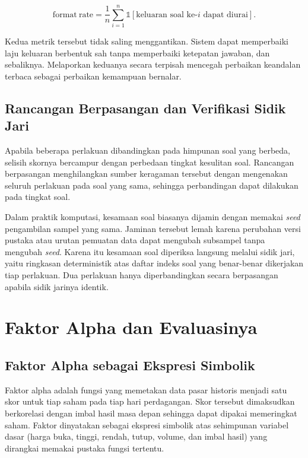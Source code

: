 \begin{equation}
    \mathrm{format\ rate} = \frac{1}{n}\sum_{i=1}^{n}
    \mathbb{1}\!\left[\text{keluaran soal ke-}i\text{ dapat diurai}\right].
\end{equation}

Kedua metrik tersebut tidak saling menggantikan. Sistem dapat memperbaiki laju
keluaran berbentuk sah tanpa memperbaiki ketepatan jawaban, dan sebaliknya.
Melaporkan keduanya secara terpisah mencegah perbaikan keandalan terbaca
sebagai perbaikan kemampuan bernalar.

\subsection{Rancangan Berpasangan dan Verifikasi Sidik Jari}

Apabila beberapa perlakuan dibandingkan pada himpunan soal yang berbeda,
selisih skornya bercampur dengan perbedaan tingkat kesulitan soal. Rancangan
berpasangan menghilangkan sumber keragaman tersebut dengan mengenakan seluruh
perlakuan pada soal yang sama, sehingga perbandingan dapat dilakukan pada
tingkat soal.

Dalam praktik komputasi, kesamaan soal biasanya dijamin dengan memakai
\textit{seed} pengambilan sampel yang sama. Jaminan tersebut lemah karena
perubahan versi pustaka atau urutan pemuatan data dapat mengubah subsampel
tanpa mengubah \textit{seed}. Karena itu kesamaan soal diperiksa langsung
melalui sidik jari, yaitu ringkasan deterministik atas daftar indeks soal yang
benar-benar dikerjakan tiap perlakuan. Dua perlakuan hanya diperbandingkan
secara berpasangan apabila sidik jarinya identik.

\section{Faktor Alpha dan Evaluasinya}
\label{sec:faktor-alpha}

\subsection{Faktor Alpha sebagai Ekspresi Simbolik}

Faktor alpha adalah fungsi yang memetakan data pasar historis menjadi satu
skor untuk tiap saham pada tiap hari perdagangan. Skor tersebut dimaksudkan
berkorelasi dengan imbal hasil masa depan sehingga dapat dipakai memeringkat
saham. Faktor dinyatakan sebagai ekspresi simbolik atas sehimpunan variabel
dasar (harga buka, tinggi, rendah, tutup, volume, dan imbal hasil) yang
dirangkai memakai pustaka fungsi tertentu.

